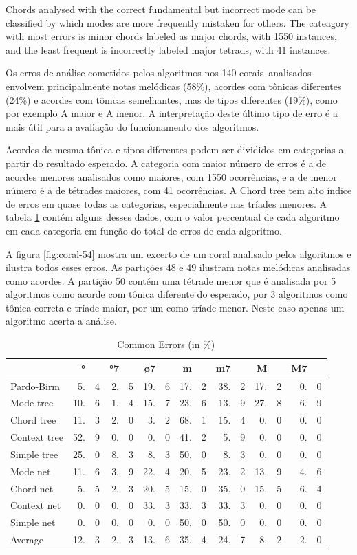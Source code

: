 \documentclass{article}
\begin{document}
Chords analysed with the correct fundamental but incorrect mode can be
classified by which modes are more frequently mistaken for others. The
cateagory with most errors is minor chords labeled as major chords,
with 1550 instances, and the least frequent is incorrectly labeled
major tetrads, with 41 instances.

Os erros de análise cometidos pelos algoritmos nos 140 corais\
analisados envolvem principalmente notas melódicas (58\%), acordes com
tônicas diferentes (24\%) e acordes com tônicas semelhantes, mas de
tipos diferentes (19\%), como por exemplo A maior e A menor. A
interpretação deste último tipo de erro é a mais útil para a avaliação
do funcionamento dos algoritmos.

Acordes de mesma tônica e tipos diferentes podem ser divididos em
categorias a partir do resultado esperado. A categoria com maior
número de erros é a de acordes menores analisados como maiores, com
1550 ocorrências, e a de menor número é a de tétrades maiores, com 41
ocorrências. A Chord tree tem alto índice de erros em quase todas as
categorias, especialmente nas tríades menores. A tabela
\ref{tab:common-errors} contém alguns desses dados, com o valor
percentual de cada algoritmo em cada categoria em função do total de
erros de cada algoritmo.

A figura \ref{fig:coral-54} mostra um excerto de um coral analisado
pelos algoritmos e ilustra todos esses erros. As partições 48 e 49
ilustram notas melódicas analisadas como acordes. A partição 50 contém
uma tétrade menor que é analisada por 5 algoritmos como acorde com
tônica diferente do esperado, por 3 algoritmos como tônica correta e
tríade maior, por um como tríade menor. Neste caso apenas um algoritmo
acerta a análise.

\begin{table}
  \centering
  \begin{tabular}{l|r@{}p{.001cm}r@{}p{.001cm}r@{}p{.001cm}r@{}p{.001cm}r@{}p{.001cm}r@{}p{.001cm}r@{}p{.001cm}}
                 &   °&&  °7&&  ø7&&   m&&  m7&&   M&&  M7 &\\
    \hline
    Pardo-Birm   & 5.&4& 2.&5&19.&6&17.&2&38.&2&17.&2& 0.&0\\
    Mode tree    &10.&6& 1.&4&15.&7&23.&6&13.&9&27.&8& 6.&9\\
    Chord tree   &11.&3& 2.&0& 3.&2&68.&1&15.&4& 0.&0& 0.&0\\
    Context tree &52.&9& 0.&0& 0.&0&41.&2& 5.&9& 0.&0& 0.&0\\
    Simple tree  &25.&0& 8.&3& 8.&3&50.&0& 8.&3& 0.&0& 0.&0\\
    Mode net     &11.&6& 3.&9&22.&4&20.&5&23.&2&13.&9& 4.&6\\
    Chord net    & 5.&5& 2.&3&20.&5&15.&0&35.&0&15.&5& 6.&4\\
    Context net  & 0.&0& 0.&0&33.&3&33.&3&33.&3& 0.&0& 0.&0\\
    Simple net   & 0.&0& 0.&0& 0.&0&50.&0&50.&0& 0.&0& 0.&0\\
    Average      &12.&3& 2.&3&13.&6&35.&4&24.&7& 8.&2& 2.&0\\ 
  \end{tabular}
  \caption{Common Errors (in \%)}
  \label{tab:common-errors}
\end{table}
\end{document}
